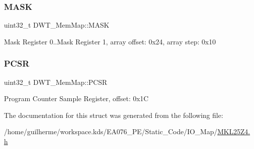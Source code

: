 \subsubsection{\texorpdfstring{M\+A\+SK}{MASK}}
{\footnotesize\ttfamily uint32\+\_\+t D\+W\+T\+\_\+\+Mem\+Map\+::\+M\+A\+SK}

Mask Register 0..Mask Register 1, array offset\+: 0x24, array step\+: 0x10 \mbox{\label{struct_d_w_t___mem_map_a58d461cd26674ff3bce87778c4b54164}} 
\subsubsection{\texorpdfstring{P\+C\+SR}{PCSR}}
{\footnotesize\ttfamily uint32\+\_\+t D\+W\+T\+\_\+\+Mem\+Map\+::\+P\+C\+SR}

Program Counter Sample Register, offset\+: 0x1C 

The documentation for this struct was generated from the following file\+:\begin{DoxyCompactItemize}
\item 
/home/guilherme/workspace.\+kds/\+E\+A076\+\_\+\+P\+E/\+Static\+\_\+\+Code/\+I\+O\+\_\+\+Map/\hyperlink{_m_k_l25_z4_8h}{M\+K\+L25\+Z4.\+h}\end{DoxyCompactItemize}

